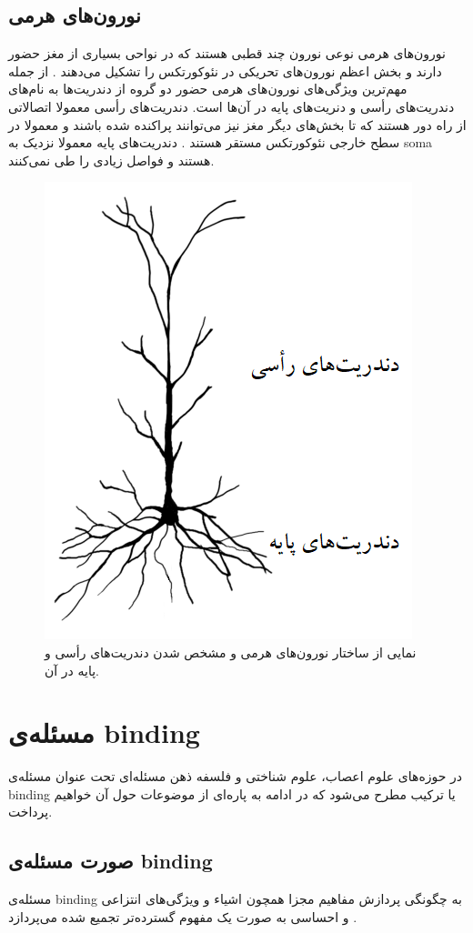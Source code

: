 \documentclass[12pt]{report}
\begin{document}
	
	\subsection{نورون‌های هرمی}
	
	نورون‌های هرمی نوعی نورون چند قطبی هستند که در نواحی بسیاری از مغز حضور دارند و بخش اعظم نورون‌های تحریکی در نئوکورتکس را تشکیل می‌دهند \cite{Hawkins2016}.
	از جمله مهم‌ترین ویژگی‌های نورون‌های هرمی حضور دو گروه از دندریت‌ها به نام‌های دندریت‌های رأسی و دنریت‌های پایه در آن‌ها است.
	دندریت‌های رأسی معمولا اتصالاتی از راه دور هستند که تا بخش‌های دیگر مغز نیز می‌توانند پراکنده شده باشند و معمولا در سطح خارجی نئوکورتکس مستقر هستند \cite{MEGIAS2001527}. دندریت‌‌های پایه معمولا نزدیک به \gls{soma} هستند و فواصل زیادی را طی نمی‌کنند.
	
	\begin{figure}[H]
		\centering
		\includegraphics[width=0.5\linewidth]{pyramidal.png}
		\caption[NS]{
			نمایی از ساختار نورون‌های هرمی و مشخص شدن دندریت‌های رأسی و پایه در آن.
		}
		\label{fig:pyramidal}
	\end{figure}
	
	\section{مسئله‌ی \gls{binding}}
	
	در حوزه‌های علوم اعصاب، علوم شناختی و فلسفه ذهن مسئله‌ای تحت عنوان مسئله‌ی \gls{binding}
	یا ترکیب 
	مطرح می‌شود که در ادامه به پاره‌ای از موضوعات حول آن خواهیم پرداخت.
	
	\subsection{صورت مسئله‌ی \gls{binding}}
	مسئله‌ی \gls{binding} به چگونگی پردازش مفاهیم مجزا همچون اشیاء و ویژگی‌های انتزاعی و احساسی به صورت یک مفهوم گسترده‌تر تجمیع شده می‌پردازد
	\cite{REVONSUO1999123}.
	
\end{document}
